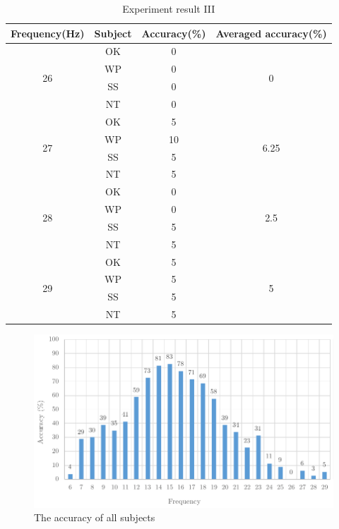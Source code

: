 \begin{table}[ht]
\centering
\begin{tabular}{| c | c | c | c |}   

    \hline
	\textbf{Frequency(Hz)}&
	\textbf{Subject}&
	\textbf{Accuracy(\%)}&
	\textbf{Averaged accuracy(\%)}\\
            \hline
            \multirow{4}{*}{26}&OK&0&\multirow{4}{*}{0} \\
			\cline{2-3}
			&WP&0& \\ \cline{2-3}
			&SS&0& \\ \cline{2-3}
			&NT&0& \\
            \hline
            \multirow{4}{*}{27}&OK&5&\multirow{4}{*}{6.25} \\
			\cline{2-3}
			&WP&10& \\ \cline{2-3}
			&SS&5& \\ \cline{2-3}
			&NT&5& \\
            \hline
            \multirow{4}{*}{28}&OK&0&\multirow{4}{*}{2.5} \\
			\cline{2-3}
			&WP&0& \\ \cline{2-3}
			&SS&5& \\ \cline{2-3}
			&NT&5& \\
            \hline
            \multirow{4}{*}{29}&OK&5&\multirow{4}{*}{5} \\
			\cline{2-3}
			&WP&5& \\ \cline{2-3}
			&SS&5& \\ \cline{2-3}
			&NT&5& \\
            \hline
		\end{tabular}       
\caption{Experiment result III}
\label{table:result3_3}
\end{table}

\begin{figure}[ht]
	\centering
	\includegraphics[scale = 1]{chapter7/exp4.pdf}
	\caption{The accuracy of all subjects}
    \label{fig:avg_exp3}
\end{figure}

